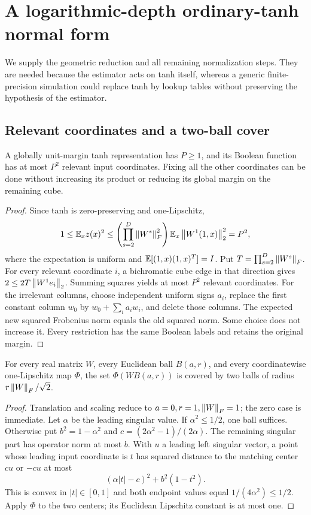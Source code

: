 \section{A logarithmic-depth ordinary-tanh normal form}
\label{app:normal}

We supply the geometric reduction and all remaining normalization
steps. They are needed because the estimator acts on tanh itself,
whereas a generic finite-precision simulation could replace tanh by
lookup tables without preserving the hypothesis of the estimator.

\subsection{Relevant coordinates and a two-ball cover}

\begin{lemma}
\label{lem:relevant}
A globally unit-margin tanh representation has $P\ge1$, and its
Boolean function has at most $P^2$ relevant input coordinates.
Fixing all the other coordinates can be done without increasing its
product or reducing its global margin on the remaining cube.
\end{lemma}
\begin{proof}
Since tanh is zero-preserving and one-Lipschitz,
\[
 1\le\mathbb E_x z(x)^2\le
 \left(\prod_{s=2}^D\left\lVert W^s\right\rVert_F^2\right)
 \mathbb E_x\left\lVert W^1(1,x)\right\rVert_2^2=P^2,
\]
where the expectation is uniform and
$\mathbb E[(1,x)(1,x)^T]=I$. Put $T=\prod_{s=2}^D\left\lVert W^s\right\rVert_F$.
For every relevant coordinate $i$, a bichromatic cube edge in that
direction gives $2\le2T\left\lVert W^1e_i\right\rVert_2$. Summing squares yields
at most $P^2$ relevant coordinates. For the irrelevant columns,
choose independent uniform signs $a_i$, replace the first constant
column $w_0$ by $w_0+\sum_i a_iw_i$, and delete those columns.
The expected new squared Frobenius norm equals the old squared norm.
Some choice does not increase it. Every restriction has the same
Boolean labels and retains the original margin.
\end{proof}

\begin{lemma}
\label{lem:twoball}
For every real matrix $W$, every Euclidean ball $B(a,r)$, and every
coordinatewise one-Lipschitz map $\Phi$, the set
$\Phi(W B(a,r))$ is covered by two balls of radius
$r\left\lVert W\right\rVert_F/\sqrt2$.
\end{lemma}
\begin{proof}
Translation and scaling reduce to $a=0,r=1,\left\lVert W\right\rVert_F=1$;
the zero case is immediate. Let $\alpha$ be the leading singular
value. If $\alpha^2\le1/2$, one ball suffices. Otherwise put
$b^2=1-\alpha^2$ and $c=(2\alpha^2-1)/(2\alpha)$.
The remaining singular part has operator norm at most $b$.
With $u$ a leading left singular vector, a point whose leading
input coordinate is $t$ has squared distance to the matching
center $cu$ or $-cu$ at most
\[
 (\alpha|t|-c)^2+b^2(1-t^2).
\]
This is convex in $|t|\in[0,1]$ and both endpoint values equal
$1/(4\alpha^2)\le1/2$. Apply $\Phi$ to the two centers;
its Euclidean Lipschitz constant is at most one.
\end{proof}

